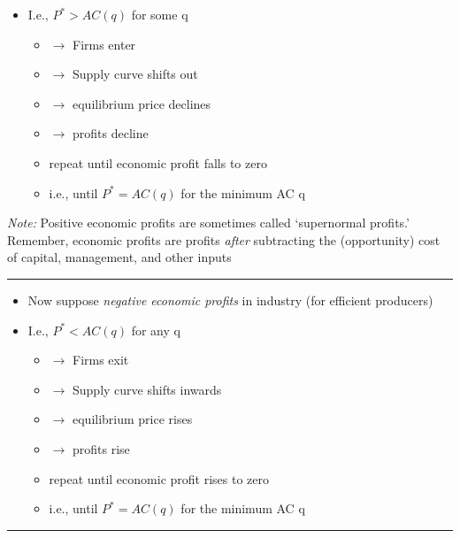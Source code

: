 \documentclass[]{article}
\providecommand{\tightlist}{%
  \setlength{\itemsep}{0pt}\setlength{\parskip}{0pt}}
\begin{document}
\begin{itemize}
\tightlist
\item
  I.e., \(P^*>AC(q)\) for some q

  \begin{itemize}
  \tightlist
  \item
    \(\rightarrow\) Firms enter
  \item
    \(\rightarrow\) Supply curve shifts out
  \item
    \(\rightarrow\) equilibrium price declines
  \item
    \(\rightarrow\) profits decline
  \item
    repeat until economic profit falls to zero
  \item
    i.e., until \(P^*=AC(q)\) for the minimum AC q
  \end{itemize}
\end{itemize}

\emph{Note:}
Positive economic profits are sometimes called `supernormal profits.'\\
Remember, economic profits are profits \emph{after} subtracting the (opportunity) cost of capital, management, and other inputs

\begin{center}\rule{0.5\linewidth}{\linethickness}\end{center}

\begin{itemize}
\tightlist
\item
  Now suppose \emph{negative economic profits} in industry (for efficient producers)
\item
  I.e., \(P^*<AC(q)\) for any q

  \begin{itemize}
  \tightlist
  \item
    \(\rightarrow\) Firms exit
  \item
    \(\rightarrow\) Supply curve shifts inwards
  \item
    \(\rightarrow\) equilibrium price rises
  \item
    \(\rightarrow\) profits rise
  \item
    repeat until economic profit rises to zero
  \item
    i.e., until \(P^*=AC(q)\) for the minimum AC q
  \end{itemize}
\end{itemize}

\begin{center}\rule{0.5\linewidth}{\linethickness}\end{center}
\end{document}
